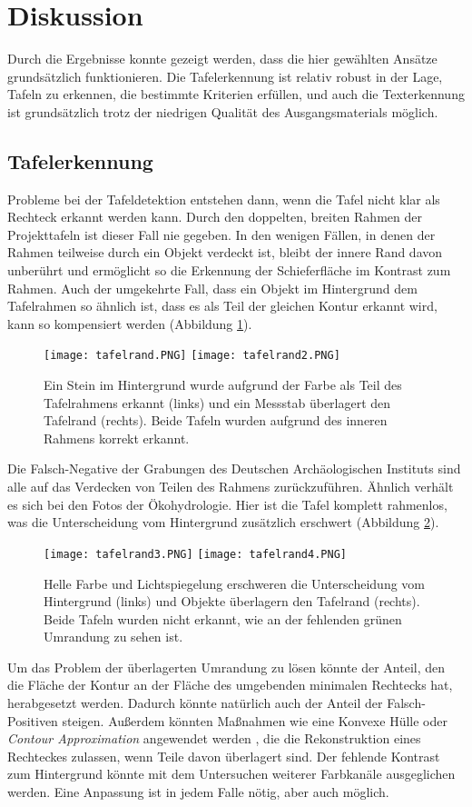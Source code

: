 \section{Diskussion}

Durch die Ergebnisse konnte gezeigt werden, dass die hier gewählten Ansätze grundsätzlich funktionieren. Die Tafelerkennung ist relativ robust in der Lage, Tafeln zu erkennen, die bestimmte Kriterien erfüllen, und auch die Texterkennung ist grundsätzlich trotz der niedrigen Qualität des Ausgangsmaterials möglich.
\subsection{Tafelerkennung}
Probleme bei der Tafeldetektion entstehen dann, wenn die Tafel nicht klar als Rechteck erkannt werden kann. Durch den doppelten, breiten Rahmen der Projekttafeln ist dieser Fall nie gegeben. In den wenigen Fällen, in denen der Rahmen teilweise durch ein Objekt verdeckt ist, bleibt der innere Rand davon unberührt und ermöglicht so die Erkennung der Schieferfläche im Kontrast zum Rahmen. Auch der umgekehrte Fall, dass ein Objekt im Hintergrund dem Tafelrahmen so ähnlich ist, dass es als Teil der gleichen Kontur erkannt wird, kann so kompensiert werden (Abbildung \ref{fig:tafelrand}).
\begin{figure}[h!]
\texttt{[image: tafelrand.PNG]}
\texttt{[image: tafelrand2.PNG]}
\caption{Ein Stein im Hintergrund wurde aufgrund der Farbe als Teil des Tafelrahmens erkannt (links) und ein Messstab überlagert den Tafelrand (rechts). Beide Tafeln wurden aufgrund des inneren Rahmens korrekt erkannt.}
\label{fig:tafelrand}
\end{figure}
Die Falsch-Negative der Grabungen des Deutschen Archäologischen Instituts sind alle auf das Verdecken von Teilen des Rahmens zurückzuführen. Ähnlich verhält es sich bei den Fotos der Ökohydrologie. Hier ist die Tafel komplett rahmenlos, was die Unterscheidung vom Hintergrund zusätzlich erschwert (Abbildung \ref{fig:tafelrand2}).
\begin{figure}[h!]
\texttt{[image: tafelrand3.PNG]}
\texttt{[image: tafelrand4.PNG]}
\caption{Helle Farbe und Lichtspiegelung erschweren die Unterscheidung vom Hintergrund (links) und Objekte überlagern den Tafelrand (rechts). Beide Tafeln wurden nicht erkannt, wie an der fehlenden grünen Umrandung zu sehen ist.}
\label{fig:tafelrand2}
\end{figure}
Um das Problem der überlagerten Umrandung zu lösen könnte der Anteil, den die Fläche der Kontur an der Fläche des umgebenden minimalen Rechtecks hat, herabgesetzt werden. Dadurch könnte natürlich auch der Anteil der Falsch-Positiven steigen. Außerdem könnten Maßnahmen wie eine Konvexe Hülle oder \textit{Contour Approximation} angewendet werden  \cite{opencvcontours}, die die Rekonstruktion eines Rechteckes zulassen, wenn Teile davon überlagert sind. Der fehlende Kontrast zum Hintergrund könnte mit dem Untersuchen weiterer Farbkanäle ausgeglichen werden. Eine Anpassung ist in jedem Falle nötig, aber auch möglich.
